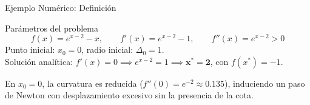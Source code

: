 \begin{frame}{Ejemplo Numérico: Definición}
    \begin{exampleblock}{Parámetros del problema}
        \small
        \[
            f(x) = e^{x-2} - x, \qquad
            f'(x) = e^{x-2} - 1, \qquad
            f''(x) = e^{x-2} > 0
        \]
        Punto inicial: \(x_0 = 0\), radio inicial: \(\Delta_0 = 1\).
        \\[0.3em]
        Solución analítica: \(f'(x)=0 \implies e^{x-2}=1 \implies \mathbf{x^{*} = 2}\), con \(f(x^{*}) = -1\).
    \end{exampleblock}

    \vspace{0.4em}
    \begin{center}
    \end{center}

    \vspace{-0.2em}
    \scriptsize
    En \(x_0=0\), la curvatura es reducida (\(f''(0)=e^{-2}\approx 0.135\)), induciendo un paso de Newton con desplazamiento excesivo sin la presencia de la cota.
\end{frame}

